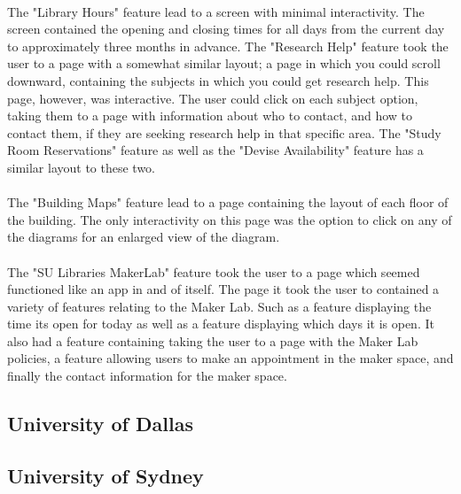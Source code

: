 \paragraph{}
The "Library Hours" feature lead to a screen with minimal interactivity. The screen contained the opening and closing times for all days from the current day to approximately three months in advance. The "Research Help" feature took the user to a page with a somewhat similar layout; a page in which you could scroll downward, containing the subjects in which you could get research help. This page, however, was interactive. The user could click on each subject option, taking them to a page with information about who to contact, and how to contact them, if they are seeking research help in that specific area.  The "Study Room Reservations" feature as well as the "Devise Availability" feature has a similar layout to these two.
\paragraph{}
The "Building Maps" feature lead to a page containing the layout of each floor of the building. The only interactivity on this page was the option to click on any of the diagrams for an enlarged view of the diagram. 
\paragraph{}
The "SU Libraries MakerLab" feature took the user to a page which seemed functioned like an app in and of itself. The page it took the user to contained a variety of features relating to the Maker Lab. Such as a feature displaying the time its open for today as well as a feature displaying which days it is open. It also had a feature containing taking the user to a page with the Maker Lab policies, a feature allowing users to make an appointment in the maker space, and finally the contact information for the maker space. 
\paragraph{}

\subsection{University of Dallas}
\subsection{University of Sydney}